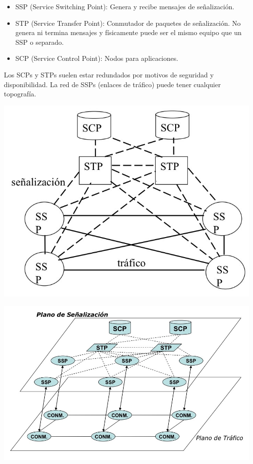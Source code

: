 \documentclass[10pt,portrait, twocolumn]{article}
\begin{document}
	\begin{itemize}
		\item SSP (Service Switching Point): Genera y recibe mensajes de señalización.
		\item STP (Service Transfer Point): Conmutador de paquetes de señalización. No genera ni termina mensajes y físicamente puede ser el mismo equipo que un SSP o separado.
		\item SCP (Service Control Point): Nodos para aplicaciones.
	\end{itemize}

Los SCPs y STPs suelen estar redundados por motivos de seguridad y disponibilidad. La red de SSPs (enlaces de tráfico) puede tener cualquier topografía.

	\begin{center}
		\includegraphics[scale = 0.2]{RedSSP}
	\end{center}

	\begin{center}
		\includegraphics[scale = 0.2]{PlanoSS7}
	\end{center}
\end{document}

